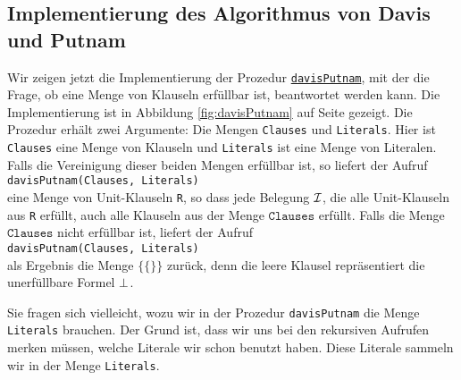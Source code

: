 \subsection{Implementierung des Algorithmus von Davis und Putnam}
Wir zeigen jetzt die Implementierung der Prozedur 
\href{https://github.com/karlstroetmann/Logik/blob/master/SetlX/davis-putnam.stlx}{\texttt{davisPutnam}}, 
mit der die Frage, ob eine Menge von Klauseln erfüllbar ist, beantwortet werden kann. Die
Implementierung ist in Abbildung \ref{fig:davisPutnam} auf Seite \pageref{fig:davisPutnam}
gezeigt.  Die Prozedur erhält zwei Argumente: Die Mengen \texttt{Clauses} und \texttt{Literals}.
Hier ist \texttt{Clauses} eine Menge von Klauseln und \texttt{Literals} ist eine Menge von
Literalen.  Falls  die Vereinigung dieser beiden Mengen erfüllbar ist, so liefert
der Aufruf 
\\[0.2cm]
\hspace*{1.3cm}
\texttt{davisPutnam(Clauses, Literals)} 
\\[0.2cm]
eine Menge von Unit-Klauseln \texttt{R}, so
dass jede Belegung $\mathcal{I}$, die alle Unit-Klauseln aus \texttt{R} erfüllt, auch alle Klauseln aus
der Menge  $\texttt{Clauses}$ erfüllt.  Falls die Menge $\texttt{Clauses}$ nicht erfüllbar ist, liefert der Aufruf
\\[0.2cm]
\hspace*{1.3cm}
\texttt{davisPutnam(Clauses, Literals)} 
\\[0.2cm]
als Ergebnis die Menge $\bigl\{ \{\} \bigr\}$ zurück, denn die leere Klausel repräsentiert die unerfüllbare Formel $\bot$.

Sie fragen sich vielleicht, wozu wir in der Prozedur \texttt{davisPutnam} die Menge
\texttt{Literals} brauchen.  Der Grund ist, dass wir uns bei den rekursiven Aufrufen
merken müssen, welche Literale wir schon benutzt haben.  Diese Literale sammeln wir in der
Menge \texttt{Literals}.

